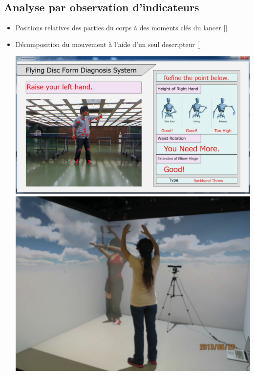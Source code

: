\documentclass[svgnames]{beamer}
\newcommand{\mycite}[1]{[\textit{\cite{#1}}]}
\begin{document}
	\subsection{Analyse par observation d'indicateurs}
	\begin{frame}{\subsecname}
		\begin{itemize}[label=$\bullet$]
			\item Positions relatives des parties du corps à des moments clés du lancer \mycite{Yamaoka2013FoF}
			\item Décomposition du mouvement à l'aide d'un seul descripteur \mycite{Kyan2015ABD}
			
			\centering
				\includegraphics[scale=0.3]{img/flying_disc_TEL.png}
				\includegraphics[scale=0.3]{img/dance_cave_TEL.png}
		\end{itemize}
		
				
	\end{frame}
	
\end{document}
